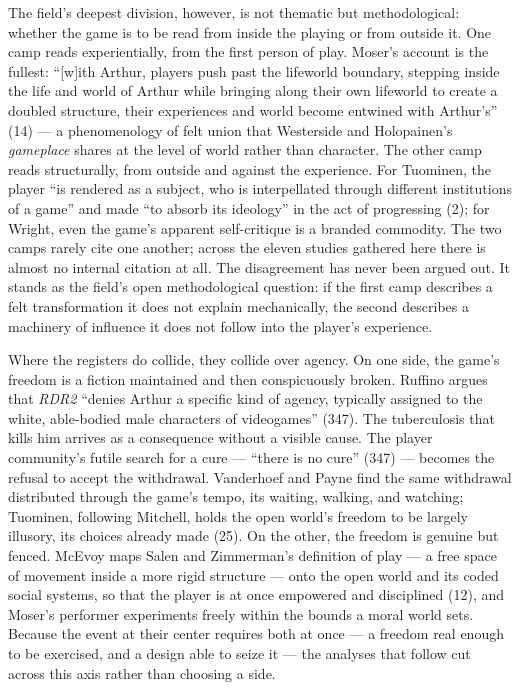 The field's deepest division, however, is not thematic but methodological: whether the game is to be read from inside the playing or from outside it. One camp reads experientially, from the first person of play. Moser's account is the fullest: ``[w]ith Arthur, players push past the lifeworld boundary, stepping inside the life and world of Arthur while bringing along their own lifeworld to create a doubled structure, their experiences and world become entwined with Arthur's'' (14) --- a phenomenology of felt union that Westerside and Holopainen's \textit{gameplace} shares at the level of world rather than character. %
The other camp reads structurally, from outside and against the experience. For Tuominen, the player ``is rendered as a subject, who is interpellated through different institutions of a game'' and made ``to absorb its ideology'' in the act of progressing (2); for Wright, even the game's apparent self-critique is a branded commodity. %
The two camps rarely cite one another; across the eleven studies gathered here there is almost no internal citation at all. The disagreement has never been argued out. It stands as the field's open methodological question: if the first camp describes a felt transformation it does not explain mechanically, the second describes a machinery of influence it does not follow into the player's experience.

Where the registers do collide, they collide over agency. On one side, the game's freedom is a fiction maintained and then conspicuously broken. Ruffino argues that \textit{RDR2} ``denies Arthur a specific kind of agency, typically assigned to the white, able-bodied male characters of videogames'' (347). The tuberculosis that kills him arrives as a consequence without a visible cause. The player community's futile search for a cure --- ``there is no cure'' (347) --- becomes the refusal to accept the withdrawal. Vanderhoef and Payne find the same withdrawal distributed through the game's tempo, its waiting, walking, and watching; Tuominen, following Mitchell, holds the open world's freedom to be largely illusory, its choices already made (25). %
On the other, the freedom is genuine but fenced. McEvoy maps Salen and Zimmerman's definition of play --- a free space of movement inside a more rigid structure --- onto the open world and its coded social systems, so that the player is at once empowered and disciplined (12), and Moser's performer experiments freely within the bounds a moral world sets. Because the event at their center requires both at once --- a freedom real enough to be exercised, and a design able to seize it --- the analyses that follow cut across this axis rather than choosing a side.

